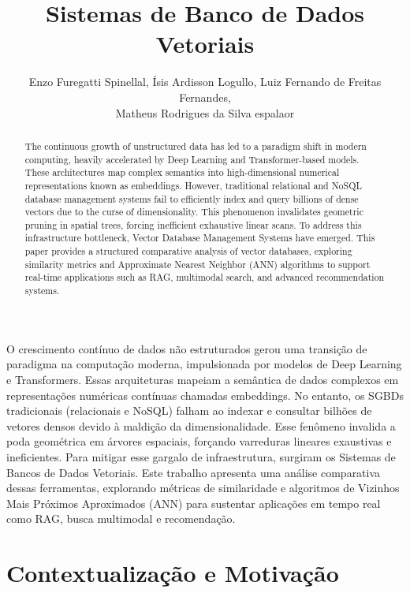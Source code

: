 \documentclass[12pt]{article}
\title{Sistemas de Banco de Dados Vetoriais}
\author{Enzo Furegatti Spinellal\inst{1}, Ísis Ardisson Logullo\inst{1}, Luiz Fernando de Freitas Fernandes\inst{1},\\ Matheus Rodrigues da Silva espalaor\inst{1} }
\begin{document}
 
	
	\maketitle
	
    \begin{abstract}
      The continuous growth of unstructured data has led to a paradigm shift in modern computing, heavily accelerated by Deep Learning and Transformer-based models. These architectures map complex semantics into high-dimensional numerical representations known as embeddings. However, traditional relational and NoSQL database management systems fail to efficiently index and query billions of dense vectors due to the curse of dimensionality. This phenomenon invalidates geometric pruning in spatial trees, forcing inefficient exhaustive linear scans. To address this infrastructure bottleneck, Vector Database Management Systems have emerged. This paper provides a structured comparative analysis of vector databases, exploring similarity metrics and Approximate Nearest Neighbor (ANN) algorithms to support real-time applications such as RAG, multimodal search, and advanced recommendation systems.
    \end{abstract}
    
    \begin{resumo} 
      O crescimento contínuo de dados não estruturados gerou uma transição de paradigma na computação moderna, impulsionada por modelos de Deep Learning e Transformers. Essas arquiteturas mapeiam a semântica de dados complexos em representações numéricas contínuas chamadas embeddings. No entanto, os SGBDs tradicionais (relacionais e NoSQL) falham ao indexar e consultar bilhões de vetores densos devido à maldição da dimensionalidade. Esse fenômeno invalida a poda geométrica em árvores espaciais, forçando varreduras lineares exaustivas e ineficientes. Para mitigar esse gargalo de infraestrutura, surgiram os Sistemas de Bancos de Dados Vetoriais. Este trabalho apresenta uma análise comparativa dessas ferramentas, explorando métricas de similaridade e algoritmos de Vizinhos Mais Próximos Aproximados (ANN) para sustentar aplicações em tempo real como RAG, busca multimodal e recomendação.
    \end{resumo}	
	
	\section{Contextualização e Motivação} \label{sec:motivacao}
	
\end{document}

